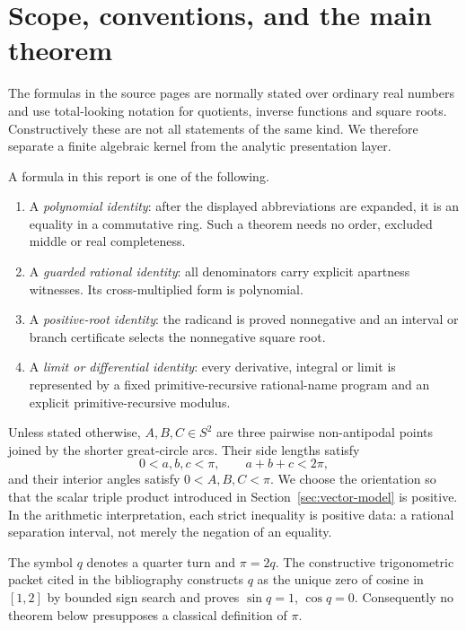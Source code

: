 \section{Scope, conventions, and the main theorem}
\label{sec:scope}

The formulas in the source pages are normally stated over ordinary real
numbers and use total-looking notation for quotients, inverse functions and
square roots.  Constructively these are not all statements of the same kind.
We therefore separate a finite algebraic kernel from the analytic presentation
layer.

\begin{definition}
A formula in this report is one of the following.
\begin{enumerate}[label=\textup{(\roman*)}]
\item A \emph{polynomial identity}: after the displayed abbreviations are
expanded, it is an equality in a commutative ring.  Such a theorem needs no
order, excluded middle or real completeness.
\item A \emph{guarded rational identity}: all denominators carry explicit
apartness witnesses.  Its cross-multiplied form is polynomial.
\item A \emph{positive-root identity}: the radicand is proved nonnegative and
an interval or branch certificate selects the nonnegative square root.
\item A \emph{limit or differential identity}: every derivative, integral or
limit is represented by a fixed primitive-recursive rational-name program and
an explicit primitive-recursive modulus.
\end{enumerate}
\end{definition}

\begin{convention}
Unless stated otherwise, \(A,B,C\in S^2\) are three pairwise non-antipodal
points joined by the shorter great-circle arcs.  Their side lengths satisfy
\[
 0<a,b,c<\pi,\qquad a+b+c<2\pi,
\]
and their interior angles satisfy \(0<A,B,C<\pi\).  We choose the orientation
so that the scalar triple product introduced in Section~\ref{sec:vector-model}
is positive.  In the arithmetic interpretation, each strict inequality is
positive data: a rational separation interval, not merely the negation of an
equality.
\end{convention}

The symbol \(q\) denotes a quarter turn and \(\pi=2q\).  The constructive
trigonometric packet cited in the bibliography constructs \(q\) as the unique
zero of cosine in \([1,2]\) by bounded sign search and proves
\(\sin q=1\), \(\cos q=0\).  Consequently no theorem below presupposes a
classical definition of \(\pi\).

